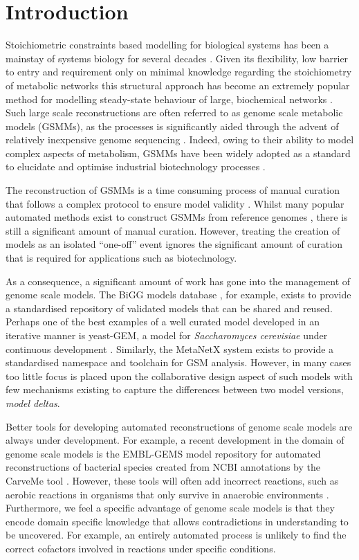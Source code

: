 \documentclass[journal=asbcd6]{achemso}
\begin{document}
\section{Introduction}
Stoichiometric constraints based modelling for biological systems has been a mainstay of systems biology for several decades \cite{fell1986fat, varma1994stoichiometric}.
Given its flexibility, low barrier to entry and requirement only on minimal knowledge regarding the stoichiometry of metabolic networks this structural approach has become an extremely popular method for modelling steady-state behaviour of large, biochemical networks \cite{kauffman2003advances}.
Such large scale reconstructions are often referred to as genome scale metabolic models (GSMMs), as the processes is significantly aided through the advent of relatively inexpensive genome sequencing \cite{o2015using, land2015insights}.
Indeed, owing to their ability to model complex aspects of metabolism, GSMMs have been widely adopted as a standard to elucidate and optimise industrial biotechnology processes \cite{kim2017current}.

The reconstruction of GSMMs is a time consuming process of manual curation that follows a complex protocol to ensure model validity \cite{thiele2010protocol}.
Whilst many popular automated methods exist to construct GSMMs from reference genomes \cite{henry2010high, poolman2006scrumpy}, there is still a significant amount of manual curation.
However, treating the creation of models as an isolated ``one-off'' event ignores the significant amount of curation that is required for applications such as biotechnology.

As a consequence, a significant amount of work has gone into the management of genome scale models.
The BiGG models database \cite{king2015bigg}, for example, exists to provide a standardised repository of validated models that can be shared and reused.
Perhaps one of the best examples of a well curated model developed in an iterative manner is yeast-GEM, a model for \textit{Saccharomyces cerevisiae} under continuous development \cite{benjamin_sanchez_2018_1994089}.
Similarly, the MetaNetX \cite{moretti2016metanetx} system exists to provide a standardised namespace and toolchain for GSM analysis.
However, in many cases too little focus is placed upon the collaborative design aspect of such models with few mechanisms existing to capture the differences between two model versions, \textit{model deltas}.

Better tools for developing automated reconstructions of genome scale models are always under development.
For example, a recent development in the domain of genome scale models is the EMBL-GEMS model repository for automated reconstructions of bacterial species created from NCBI annotations by the CarveMe tool \cite{machado2018fast}.
However, these tools will often add incorrect reactions, such as aerobic reactions in organisms that only survive in anaerobic environments \cite{norman2018agenome}.
Furthermore, we feel a specific advantage of genome scale models is that they encode domain specific knowledge that allows contradictions in understanding to be uncovered.
For example, an entirely automated process is unlikely to find the correct cofactors involved in reactions under specific conditions.
\end{document}
